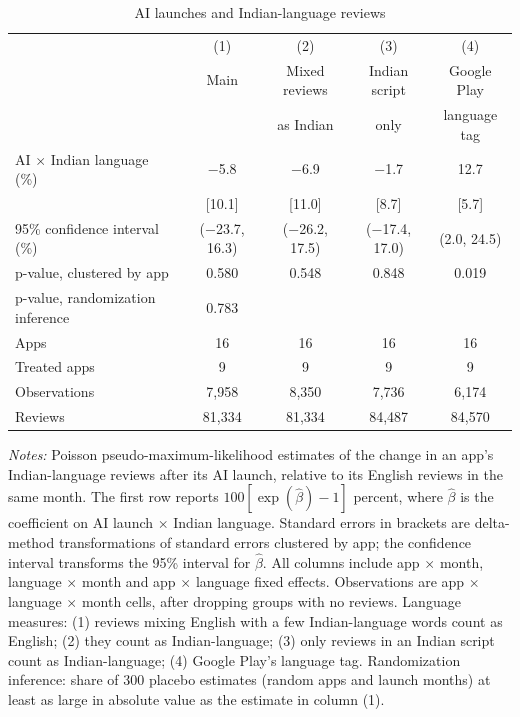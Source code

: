 \begin{table}[htbp]
\centering
\begin{threeparttable}
\caption{AI launches and Indian-language reviews}
\label{tab:main}
\begin{tabular}{@{}lcccc@{}}
\toprule
 & (1) & (2) & (3) & (4) \\
 & Main & Mixed reviews & Indian script & Google Play \\
 &  & as Indian & only & language tag \\
\midrule
AI $\times$ Indian language (\%) & $-$5.8 & $-$6.9 & $-$1.7 & 12.7 \\
 & [10.1] & [11.0] & [8.7] & [5.7] \\
95\% confidence interval (\%) & ($-$23.7, 16.3) & ($-$26.2, 17.5) & ($-$17.4, 17.0) & (2.0, 24.5) \\
p-value, clustered by app & 0.580 & 0.548 & 0.848 & 0.019 \\
p-value, randomization inference & 0.783 &  &  &  \\
\midrule
Apps & 16 & 16 & 16 & 16 \\
Treated apps & 9 & 9 & 9 & 9 \\
Observations & 7,958 & 8,350 & 7,736 & 6,174 \\
Reviews & 81,334 & 81,334 & 84,487 & 84,570 \\
\bottomrule
\end{tabular}
\begin{tablenotes}[flushleft]
\footnotesize
\item \textit{Notes:} Poisson pseudo-maximum-likelihood estimates of the change in an app's Indian-language reviews after its AI launch, relative to its English reviews in the same month. The first row reports $100[\exp(\hat\beta)-1]$ percent, where $\hat\beta$ is the coefficient on AI launch $\times$ Indian language. Standard errors in brackets are delta-method transformations of standard errors clustered by app; the confidence interval transforms the 95\% interval for $\hat\beta$. All columns include app $\times$ month, language $\times$ month and app $\times$ language fixed effects. Observations are app $\times$ language $\times$ month cells, after dropping groups with no reviews. Language measures: (1) reviews mixing English with a few Indian-language words count as English; (2) they count as Indian-language; (3) only reviews in an Indian script count as Indian-language; (4) Google Play's language tag. Randomization inference: share of 300 placebo estimates (random apps and launch months) at least as large in absolute value as the estimate in column (1).
\end{tablenotes}
\end{threeparttable}
\end{table}

